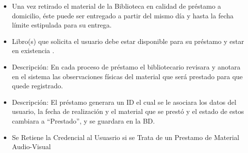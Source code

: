 \begin{PDescripcion}
\begin{enumerate}
\begin{itemize}
	 \item {} Una vez retirado el material de la Biblioteca en calidad de préstamo a domicilio, éste puede ser entregado a partir del mismo día y hasta la fecha límite estipulada para su entrega.
	 \item {} Libro(s) que solicita el usuario debe estar disponible para su préstamo y estar en existencia . 
	 \item {} Descripción: En cada proceso de préstamo el bibliotecario revisara y anotara en el sistema las observaciones físicas del material que será prestado para que quede registrado.
	 \item {} Descripción: El préstamo generara un ID el cual se le asociara los datos del usuario, la fecha  de realización y el material que se prestó y el estado de estos cambiara a “Prestado”, y se guardara en la BD.
	  \item {} Se Retiene la Credencial al Usuasrio si se Trata de un Prestamo de Material Audio-Visual
	 
	 



	  
	  
	  
\end{itemize}

    \end{enumerate}

\end{PDescripcion}
